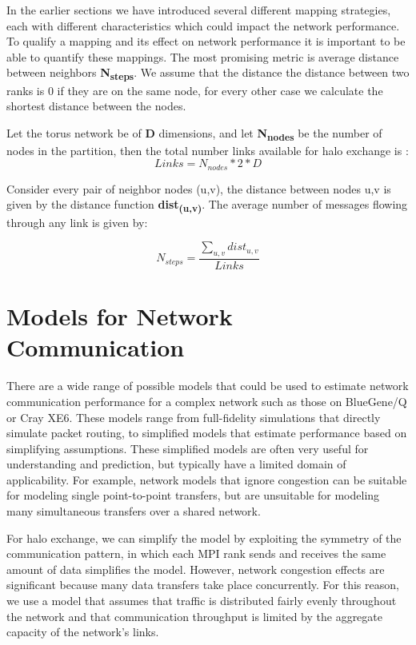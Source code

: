 \documentclass{acm_proc_article-sp}
\begin{document}
In the earlier sections we have introduced several different mapping strategies, each with different characteristics which could
impact the network performance. To qualify a mapping and its effect on network performance it is important to be able to quantify
these mappings. The most promising metric is average distance between neighbors \textbf{N\textsubscript{steps}}.
We assume that the distance the distance between two ranks is 0 if they are on the same node, for every other case we calculate
the shortest distance between the nodes.

Let the torus network be of \textbf{D} dimensions, and let \textbf{N\textsubscript{nodes}} be the number of nodes in the partition, then
the total number links available for halo exchange is :
\begin{equation}
  Links = N_{nodes} * 2 * D
\end{equation}

Consider every pair of neighbor nodes (u,v), the distance between nodes u,v is given by the distance function \textbf{dist\textsubscript{(u,v)}}.
The average number of messages flowing through any link is given by:

\begin{equation}
  N_{steps} = \frac{ \sum\limits_{u,v} dist_{u,v} } {Links}
\end{equation}


\section{Models for Network Communication}

There are a wide range of possible models that could be used to
estimate network communication performance for a complex network
such as those on BlueGene/Q or Cray XE6.  These models range from
full-fidelity simulations that directly simulate packet routing, to
simplified models that estimate performance based on simplifying
assumptions.  These simplified models are often very useful for
understanding and prediction, but typically have a limited domain
of applicability.  For example, network models that ignore congestion
can be suitable for modeling single point-to-point transfers, but are
unsuitable for modeling many simultaneous transfers over a shared network.

For halo exchange, we can simplify the model by exploiting the
symmetry of the communication pattern, in which each MPI rank sends
and receives the same amount of data simplifies the model.  However,
network congestion effects are significant because many data transfers
take place concurrently.  For this reason, we use a model that assumes
that traffic is distributed fairly evenly throughout the network and
that communication throughput is limited by the aggregate capacity
of the network's links.
\end{document}
